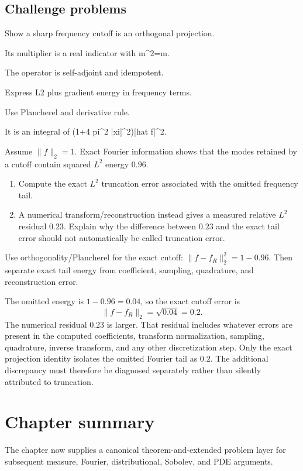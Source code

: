 \subsection*{Challenge problems}

\begin{exercise}[Projection]\label{exr:iii13-expand-15}
Show a sharp frequency cutoff is an orthogonal projection.
\end{exercise}
\begin{hint}
Its multiplier is a real indicator with m\textasciicircum{}2=m.
\end{hint}
\begin{solution}
The operator is self-adjoint and idempotent.
\end{solution}

\begin{exercise}\label{exr:iii13-expand-16}
Express L2 plus gradient energy in frequency terms.
\end{exercise}
\begin{hint}
Use Plancherel and derivative rule.
\end{hint}
\begin{solution}
It is an integral of (1+4 pi\textasciicircum{}2 |xi|\textasciicircum{}2)|hat f|\textasciicircum{}2.
\end{solution}
\begin{exercise}\label{exr:iii13-numerical-energy-01}
Assume \(\|f\|_2=1\).  Exact Fourier information shows that the modes retained
by a cutoff contain squared \(L^2\) energy \(0.96\).

\begin{enumerate}
\item Compute the exact \(L^2\) truncation error associated with the omitted
frequency tail.
\item A numerical transform/reconstruction instead gives a measured relative
\(L^2\) residual \(0.23\).  Explain why the difference between \(0.23\) and the
exact tail error should not automatically be called truncation error.
\end{enumerate}
\end{exercise}
\begin{hint}
Use orthogonality/Plancherel for the exact cutoff:
\(\|f-f_R\|_2^2=1-0.96\).  Then separate exact tail energy from coefficient,
sampling, quadrature, and reconstruction error.
\end{hint}
\begin{solution}
The omitted energy is \(1-0.96=0.04\), so the exact cutoff error is
\[
\|f-f_R\|_2=\sqrt{0.04}=0.2.
\]
The numerical residual \(0.23\) is larger.  That residual includes whatever
errors are present in the computed coefficients, transform normalization,
sampling, quadrature, inverse transform, and any other discretization step.
Only the exact projection identity isolates the omitted Fourier tail as
\(0.2\).  The additional discrepancy must therefore be diagnosed separately
rather than silently attributed to truncation.
\end{solution}

\section*{Chapter summary}
The chapter now supplies a canonical theorem-and-extended problem layer for subsequent measure, Fourier, distributional, Sobolev, and PDE arguments.
